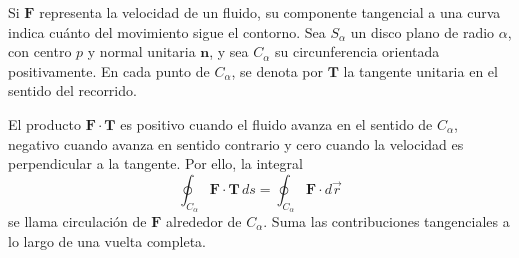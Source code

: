 \begin{center}
\begin{minipage}{.94\textwidth}
\centering
\begingroup\shorthandoff{>}
\endgroup
\end{minipage}
\end{center}

Si $\mathbf F$ representa la velocidad de un fluido, su componente tangencial a una curva indica cuánto del movimiento sigue el contorno. Sea $S_\alpha$ un disco plano de radio $\alpha$, con centro $p$ y normal unitaria $\mathbf n$, y sea $C_\alpha$ su circunferencia orientada positivamente. En cada punto de $C_\alpha$, se denota por $\mathbf T$ la tangente unitaria en el sentido del recorrido.

El producto $\mathbf F\cdot\mathbf T$ es positivo cuando el fluido avanza en el sentido de $C_\alpha$, negativo cuando avanza en sentido contrario y cero cuando la velocidad es perpendicular a la tangente. Por ello, la integral
\[
\oint_{C_\alpha}\mathbf F\cdot\mathbf T\,ds
=\oint_{C_\alpha}\mathbf F\cdot d\vec r
\]
se llama circulación de $\mathbf F$ alrededor de $C_\alpha$. Suma las contribuciones tangenciales a lo largo de una vuelta completa.

